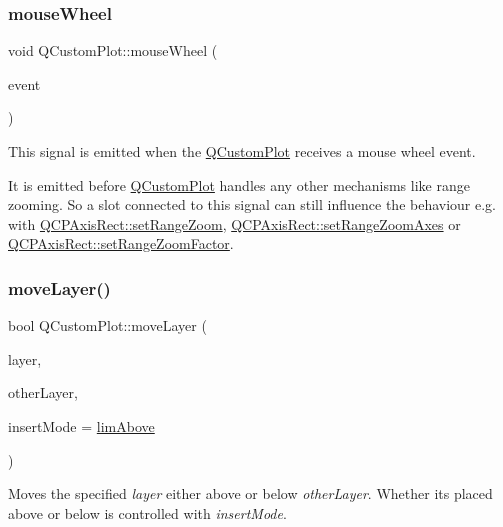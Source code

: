 \subsubsection{\texorpdfstring{mouse\+Wheel}{mouseWheel}}
{\footnotesize\ttfamily void Q\+Custom\+Plot\+::mouse\+Wheel (\begin{DoxyParamCaption}\item[{Q\+Wheel\+Event $\ast$}]{event }\end{DoxyParamCaption})\hspace{0.3cm}{\ttfamily [signal]}}

This signal is emitted when the \hyperlink{classQCustomPlot}{Q\+Custom\+Plot} receives a mouse wheel event.

It is emitted before \hyperlink{classQCustomPlot}{Q\+Custom\+Plot} handles any other mechanisms like range zooming. So a slot connected to this signal can still influence the behaviour e.\+g. with \hyperlink{classQCPAxisRect_a7960a9d222f1c31d558b064b60f86a31}{Q\+C\+P\+Axis\+Rect\+::set\+Range\+Zoom}, \hyperlink{classQCPAxisRect_a9442cca2aa358405f39a64d51eca13d2}{Q\+C\+P\+Axis\+Rect\+::set\+Range\+Zoom\+Axes} or \hyperlink{classQCPAxisRect_a895d7ac745ea614e04056244b3c138ac}{Q\+C\+P\+Axis\+Rect\+::set\+Range\+Zoom\+Factor}. \mbox{\label{classQCustomPlot_ae896140beff19424e9e9e02d6e331104}} 
\subsubsection{\texorpdfstring{move\+Layer()}{moveLayer()}}
{\footnotesize\ttfamily bool Q\+Custom\+Plot\+::move\+Layer (\begin{DoxyParamCaption}\item[{\hyperlink{classQCPLayer}{Q\+C\+P\+Layer} $\ast$}]{layer,  }\item[{\hyperlink{classQCPLayer}{Q\+C\+P\+Layer} $\ast$}]{other\+Layer,  }\item[{\hyperlink{classQCustomPlot_a75a8afbe6ef333b1f3d47abb25b9add7}{Q\+Custom\+Plot\+::\+Layer\+Insert\+Mode}}]{insert\+Mode = {\ttfamily \hyperlink{classQCustomPlot_a75a8afbe6ef333b1f3d47abb25b9add7a062b0b7825650b432a713c0df6742d41}{lim\+Above}} }\end{DoxyParamCaption})}

Moves the specified {\itshape layer} either above or below {\itshape other\+Layer}. Whether it\textquotesingle{}s placed above or below is controlled with {\itshape insert\+Mode}.

